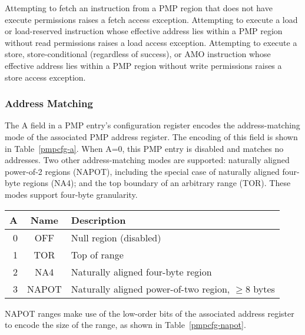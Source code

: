 Attempting to fetch an instruction from a PMP region that does not have execute
permissions raises a fetch access exception.  Attempting to execute
a load or load-reserved instruction whose effective address lies within
a PMP region without read permissions raises a load access exception.
Attempting to execute a store, store-conditional (regardless of success),
or AMO instruction whose effective address lies within a PMP region without
write permissions raises a store access exception.

\subsubsection*{Address Matching}

The A field in a PMP entry's configuration register encodes the
address-matching mode of the associated PMP address register.  The encoding of
this field is shown in Table~\ref{pmpcfg-a}.  When A=0, this PMP entry is
disabled and matches no addresses.  Two other address-matching modes are
supported: naturally aligned power-of-2 regions (NAPOT), including the special
case of naturally aligned four-byte regions (NA4); and the top boundary of an
arbitrary range (TOR).  These modes support four-byte granularity.

\begin{table*}[h!]
\begin{center}
\begin{tabular}{|r|c|l|}
\hline
A & Name & Description \\
\hline
0 & OFF   & Null region (disabled) \\
1 & TOR   & Top of range \\
2 & NA4   & Naturally aligned four-byte region \\
3 & NAPOT & Naturally aligned power-of-two region, $\ge$8 bytes \\
\hline
\end{tabular}
\end{center}
\caption{Encoding of A field in PMP configuration registers.}
\label{pmpcfg-a}
\end{table*}

NAPOT ranges make use of the low-order bits of the associated address register
to encode the size of the range, as shown in Table~\ref{pmpcfg-napot}.

